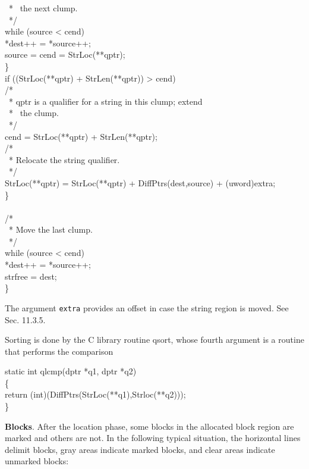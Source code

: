 \begin{iconcode}
\>\>\>\ * \ the next clump.\\
\>\>\>\ */\\
\>\>\>while (source < cend)\\
\>\>\>\>*dest++ = *source++;\\
\>\>\>source = cend = StrLoc(**qptr);\\
\>\>\>\}\\
\>\>if ((StrLoc(**qptr) + StrLen(**qptr)) > cend)\\
\>\>\>/*\\
\>\>\>\ * qptr is a qualifier for a string in this clump; extend\\
\>\>\>\ * \ the clump.\\
\>\>\>\ */\\
\>\>\>cend = StrLoc(**qptr) + StrLen(**qptr);\\
\>\>/*\\
\>\>\ * Relocate the string qualifier.\\
\>\>\ */\\
\>\>StrLoc(**qptr) = StrLoc(**qptr) + DiffPtrs(dest,source) + (uword)extra;\\
\>\>\}\\
\\
\>/*\\
\>\ * Move the last clump.\\
\>\ */\\
\>while (source < cend)\\
\>\>*dest++ = *source++;\\
\>strfree = dest;\\
\>\}
\end{iconcode}


The argument \texttt{extra} provides an offset in case the string region is
moved. See Sec. 11.3.5.

Sorting is done by the C library routine qsort, whose fourth argument
is a routine that performs the comparison

\begin{iconcode}
\>static int qlcmp(dptr *q1, dptr *q2)\\
\>\{\\
\>\>return (int)(DiffPtrs(StrLoc(**q1),Strloc(**q2)));\\
\>\}
\end{iconcode}


\textbf{Blocks}. After the location phase, some blocks in the
allocated block region are marked and others are not. In the following
typical situation, the horizontal lines delimit blocks, gray areas
indicate marked blocks, and clear areas indicate unmarked blocks:


